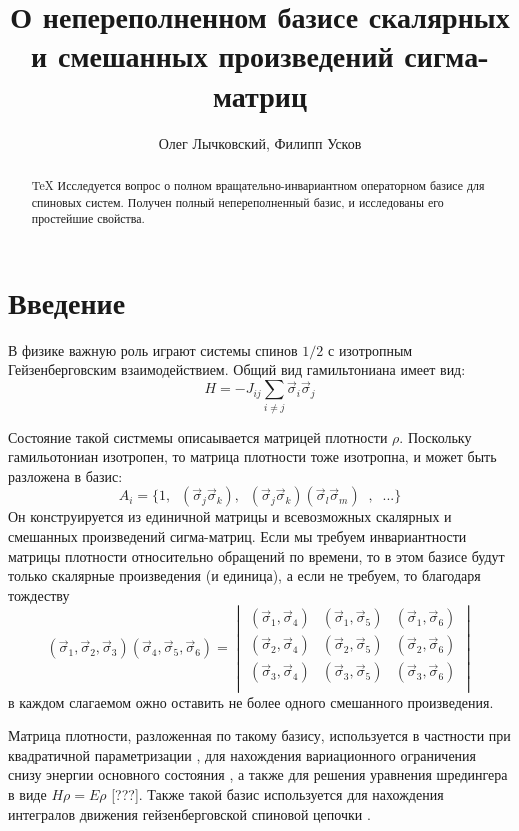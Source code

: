 \documentclass[]{article}
\title{О непереполненном базисе скалярных и смешанных произведений сигма-матриц}
\author{Олег Лычковский, Филипп Усков}
\begin{document}
\maketitle

\begin{abstract}
	
\show \TeX
Исследуется вопрос о полном вращательно-инвариантном операторном базисе для спиновых систем. Получен полный непереполненный базис, и исследованы его простейшие свойства.

\end{abstract}

\section{Введение}

В физике важную роль играют системы спинов $1/2$ с изотропным Гейзенберговским взаимодействием. Общий вид гамильтониана имеет вид:
$$H=-J_{ij}\sum_{i\neq j}\vec\sigma_i\vec\sigma_j$$

Состояние такой систмемы описаывается матрицей плотности $\rho$.
Поскольку гамильотониан изотропен, то матрица плотности тоже изотропна, и может быть разложена в базис:
$$A_i=\{ 1,  \;\;({\vec \sigma}_j{\vec\sigma}_k), \;\;
({\vec \sigma}_j{\vec\sigma}_k)({\vec \sigma}_l{\vec\sigma}_m)\;\;,\;\;...\}$$
Он конструируется из единичной матрицы и всевозможных скалярных и смешанных произведений сигма-матриц. 
Если мы требуем инвариантности матрицы плотности относительно обращений по времени, то в этом базисе будут только скалярные произведения (и единица),
а если не требуем, то благодаря тождеству 
$$(\vec\sigma_1,\vec\sigma_2,\vec\sigma_3)
(\vec\sigma_4,\vec\sigma_5,\vec\sigma_6)= 
\begin{vmatrix}
	(\vec\sigma_1,\vec\sigma_4) & 	(\vec\sigma_1,\vec\sigma_5) & (\vec\sigma_1,\vec\sigma_6) \\
	(\vec\sigma_2,\vec\sigma_4) & 	(\vec\sigma_2,\vec\sigma_5) & (\vec\sigma_2,\vec\sigma_6) \\
	(\vec\sigma_3,\vec\sigma_4) & 	(\vec\sigma_3,\vec\sigma_5) & (\vec\sigma_3,\vec\sigma_6) \\
\end{vmatrix}
$$
в каждом слагаемом ожно оставить не более одного смешанного произведения.

Матрица плотности, разложенная по такому базису, используется в частности при квадратичной параметризации \cite{kvadro},
для нахождения вариационного ограничения снизу энергии основного состояния \cite{variational}, 
а также для решения уравнения шредингера в виде $ H\rho = E\rho $ [???].
Также такой базис используется для нахождения интегралов движения гейзенберговской спиновой цепочки \cite{basisF}.
\end{document}
